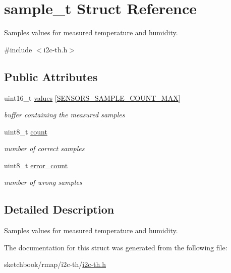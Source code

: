 \hypertarget{structsample__t}{}\section{sample\+\_\+t Struct Reference}
\label{structsample__t}


Samples values for measured temperature and humidity.  




{\ttfamily \#include $<$i2c-\/th.\+h$>$}

\subsection*{Public Attributes}
\begin{DoxyCompactItemize}
\item 
\mbox{\label{structsample__t_ab732cec6be98318b8f13563577f7d528}} 
uint16\+\_\+t \hyperlink{structsample__t_ab732cec6be98318b8f13563577f7d528}{values} \mbox{[}\hyperlink{i2c-th-config_8h_a5500c7c28f9fc2cab4deffbe07c98b39}{S\+E\+N\+S\+O\+R\+S\+\_\+\+S\+A\+M\+P\+L\+E\+\_\+\+C\+O\+U\+N\+T\+\_\+\+M\+AX}\mbox{]}
\begin{DoxyCompactList}\small\item\em buffer containing the measured samples \end{DoxyCompactList}\item 
\mbox{\label{structsample__t_a5a28abacf173c495a32a6f727e5d016e}} 
uint8\+\_\+t \hyperlink{structsample__t_a5a28abacf173c495a32a6f727e5d016e}{count}
\begin{DoxyCompactList}\small\item\em number of correct samples \end{DoxyCompactList}\item 
\mbox{\label{structsample__t_abcd5ae40e49c9c7bbfed40552ba44e72}} 
uint8\+\_\+t \hyperlink{structsample__t_abcd5ae40e49c9c7bbfed40552ba44e72}{error\+\_\+count}
\begin{DoxyCompactList}\small\item\em number of wrong samples \end{DoxyCompactList}\end{DoxyCompactItemize}


\subsection{Detailed Description}
Samples values for measured temperature and humidity. 

The documentation for this struct was generated from the following file\+:\begin{DoxyCompactItemize}
\item 
sketchbook/rmap/i2c-\/th/\hyperlink{i2c-th_8h}{i2c-\/th.\+h}\end{DoxyCompactItemize}
